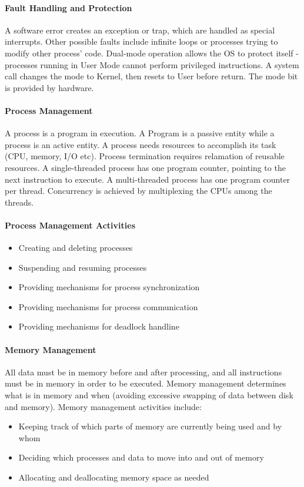\documentclass{article}
\begin{document}
\paragraph{Fault Handling and Protection} A software error creates an exception or trap, which are handled as special interrupts. Other possible faults include infinite loops or processes trying to modify other process' code. Dual-mode operation allows the OS to protect itself - processes running in User Mode cannot perform privileged instructions. A system call changes the mode to Kernel, then resets to User before return. The mode bit is provided by hardware.
\paragraph{Process Management} A process is a program in execution. A Program is a passive entity while a process is an active entity. A process needs resources to accomplish its task (CPU, memory, I/O etc). Process termination requires relamation of reusable resources. A single-threaded process has one program counter, pointing to the next instruction to execute. A multi-threaded process has one program counter per thread. Concurrency is achieved by multiplexing the CPUs among the threads.
\paragraph{Process Management Activities}
\begin{itemize}
\item Creating and deleting processes
\item Suspending and resuming processes
\item Providing mechanisms for process synchronization
\item Providing mechanisms for process communication
\item Providing mechanisms for deadlock handline
\end{itemize}
\paragraph{Memory Management} All data must be in memory before and after processing, and all instructions must be in memory in order to be executed. Memory management determines what is in memory and when (avoiding excessive swapping of data between disk and memory). Memory management activities include:
\begin{itemize}
\item Keeping track of which parts of memory are currently being used and by whom
\item Deciding which processes and data to move into and out of memory
\item Allocating and deallocating memory space as needed
\end{itemize}
\end{document}
